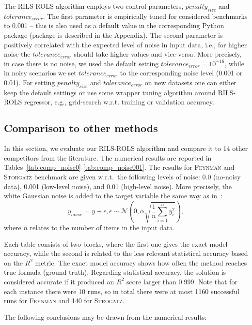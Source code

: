 \documentclass{bmcart}
\begin{document}
The \textsc{RILS}-\textsc{ROLS} algorithm employs two control parameters, $penalty_{size}$ and $tolerance_{error}$. The first parameter is empirically tuned for considered benchmarks to 0.001 -- this is also used as a default value in the corresponding Python package (package is described in the Appendix). The second parameter is positively correlated with the expected level of noise in input data, i.e., for higher noise the $tolerance_{error}$ should take higher values and vice-versa. More precisely, in case there is no noise, we used the default setting $tolerance_{error}=10^{-16}$, while in noisy scenarios we set $tolerance_{error}$ to the corresponding noise level (0.001 or 0.01). 
For setting $penalty_{size}$ and $tolerance_{error}$ on new datasets one can either keep the default settings or use some wrapper tuning algorithm around \textsc{RILS-ROLS} regressor, e.g., grid-search w.r.t. training or validation accuracy. 

\subsection{Comparison to other methods}
In this section, we evaluate our \textsc{RILS-ROLS} algorithm and compare it to 14 other competitors from the literature. The numerical results are reported in Tables~\ref{tab:comp_noise0}-\ref{tab:comp_noise001}. The results for \textsc{Feynman} and \textsc{Storgatz} benchmark are given w.r.t.\  the following levels of noise: 0.0 (no-noisy data), 0.001 (low-level noise), and 0.01 (high-level noise). More precisely, the white Gaussian noise is added to the target variable the same way as in~\cite{la2021contemporary}:
$$ y_{noise} = y + \epsilon, \epsilon \sim \mathcal{N}\left(0, \alpha \sqrt{\frac{1}{n} \sum _{i=1}^n{y_i^2}}\right),$$
where $n$ relates to the number of items in the input data.

Each table consists of two blocks, where the first one gives the exact model accuracy, while the second is related to the less relevant statistical accuracy based on the $R^2$ metric. The exact model accuracy shows how often the method reaches true formula (ground-truth). Regarding statistical accuracy, the solution is considered accurate if it produced an $R^2$ score larger than 0.999.  Note that for each instance there were 10 runs, so in total there were at most 1160 successful runs for \textsc{Feynman} and 140 for \textsc{Strogatz}.  

The following conclusions may be drawn from the numerical results: 
\end{document}
